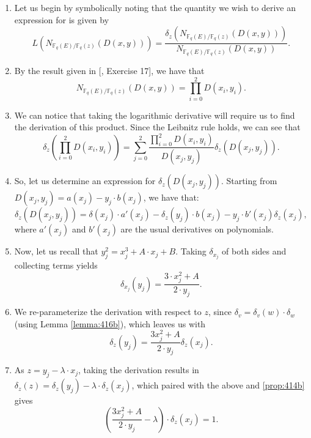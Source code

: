 \documentclass{article}
\theoremstyle{definition}
\newcommand{\6}{\mathbf}
\newcommand{\7}{\mathcal}
\begin{document}
\begin{enumerate}
\item Let us begin by symbolically noting that the quantity we wish to derive an expression for is given by
$$L(N_{\mathbb{F}_q(E)/\mathbb{F}_q(z)}(D(x,y))) = \frac{\delta_z(N_{\mathbb{F}_q(E)/\mathbb{F}_q(z)}(D(x,y)))}{N_{\mathbb{F}_q(E)/\mathbb{F}_q(z)}(D(x,y))}.$$

\item By the result given in [\cite{Dummit04}, Exercise 17], we have that
$$N_{\mathbb{F}_q(E)/\mathbb{F}_q(z)}(D(x,y)) = \prod_{i = 0}^2 D(x_i,y_i).$$

\item We can notice that taking the logarithmic derivative will require us to find the derivation of this product. Since the Leibnitz rule holds, we can see that
$$\delta_z\left( \prod_{i = 0}^2 D(x_i,y_i) \right) = \sum_{j = 0}^2 \frac{\prod_{i = 0}^2 D(x_i,y_i)}{D(x_j,y_j)} \delta_z(D(x_j,y_j)).$$

\item \label{item:dzD} So, let us determine an expression for $\delta_z(D(x_j,y_j))$. Starting from $D(x_j,y_j) = a(x_j) - y_j \cdot b(x_j)$, we have that:
$$\delta_z(D(x_j,y_j)) = \delta(x_j) \cdot a'(x_j) - \delta_z(y_j) \cdot b(x_j) - y_j \cdot b'(x_j) \delta_z(x_j),$$
where $a'(x_j)$ and $b'(x_j)$ are the usual derivatives on polynomials.

\item Now, let us recall that $y_j^2 = x_j^3 + A \cdot x_j + B$. Taking $\delta_{x_j}$ of both sides and collecting terms yields
$$\delta_{x_j}(y_j) = \frac{3 \cdot x_j^2 + A}{2 \cdot y_j}.$$

\item \label{item:dxj} We re-parameterize the derivation with respect to $z$, since $\delta_v = \delta_v(w) \cdot \delta_w$ (using Lemma \ref{lemma:416b}), which leaves us with
$$\delta_z(y_j) = \frac{3x_j^2 + A}{2 \cdot y_j} \delta_z(x_j).$$

\item As $z = y_j - \lambda \cdot x_j$, taking the derivation results in $\delta_z(z) = \delta_z(y_j) - \lambda \cdot \delta_z(x_j)$, which paired with the above and \ref{prop:414b} gives
$$\left( \frac{3x_j^2+A}{2 \cdot y_j} - \lambda \right) \cdot \delta_z(x_j)=1.$$


\end{enumerate}
\end{document}
